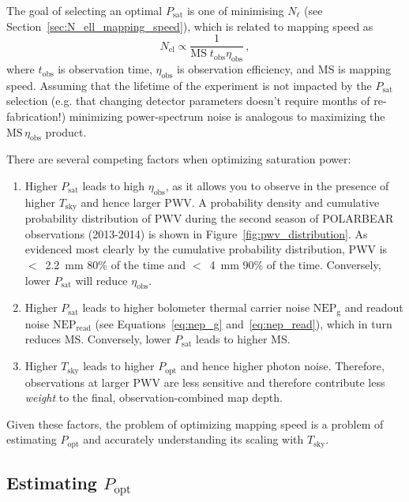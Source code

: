 The goal of selecting an optimal $P_{\mathrm{sat}}$ is one of minimising $N_{\mathrm{\ell}}$ (see Section~\ref{sec:N_ell_mapping_speed}), which is related to mapping speed as
\begin{equation}
    N_{\mathrm{el}} \propto \frac{1}{\mathrm{MS} \; t_{\mathrm{obs}} \eta_{\mathrm{obs}}} \, ,
    \label{eq:bolocalc_N_ell_mapping_speed_relation}
\end{equation}
where $t_{\mathrm{obs}}$ is observation time, $\eta_{\mathrm{obs}}$ is observation efficiency, and MS is mapping speed. Assuming that the lifetime of the experiment is not impacted by the $P_{\mathrm{sat}}$ selection (e.g. that changing detector parameters doesn't require months of re-fabrication!) minimizing power-spectrum noise is analogous to maximizing the $\mathrm{MS} \, \eta_{\mathrm{obs}}$ product.

There are several competing factors when optimizing saturation power:
\begin{enumerate}
    \item Higher $P_{\mathrm{sat}}$ leads to high $\eta_{\mathrm{obs}}$, as it allows you to observe in the presence of higher $T_{\mathrm{sky}}$ and hence larger PWV. A probability density and cumulative probability distribution of PWV during the second season of POLARBEAR observations (2013-2014) is shown in Figure~\ref{fig:pwv_distribution}. As evidenced most clearly by the cumulative probability distribution, PWV is $<$~2.2~mm 80\% of the time and $<$~4~mm 90\% of the time. Conversely, lower $P_{\mathrm{sat}}$ will reduce $\eta_{\mathrm{obs}}$. 
    \item Higher $P_{\mathrm{sat}}$ leads to higher bolometer thermal carrier noise $\mathrm{NEP_{g}}$ and readout noise $\mathrm{NEP_{read}}$ (see Equations~\ref{eq:nep_g} and~\ref{eq:nep_read}), which in turn reduces MS. Conversely, lower $P_{\mathrm{sat}}$ leads to higher MS.
    \item Higher $T_{\mathrm{sky}}$ leads to higher $P_{\mathrm{opt}}$ and hence higher photon noise. Therefore, observations at larger PWV are less sensitive and therefore contribute less \textit{weight} to the final, observation-combined map depth.
\end{enumerate}
Given these factors, the problem of optimizing mapping speed is a problem of estimating $P_{\mathrm{opt}}$ and accurately understanding its scaling with $T_{\mathrm{sky}}$.


\subsection{Estimating $P_{\mathrm{opt}}$}
\label{sec:pb2c_psat_estimating_popt}

